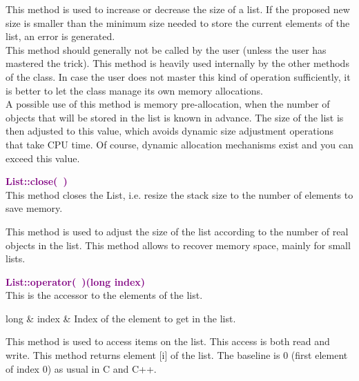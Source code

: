 This method is used to increase or decrease the size of a list.
If the proposed new size is smaller than the minimum size needed to store the current elements of the list, an error is generated.\\
This method should generally not be called by the user (unless the user has mastered the trick).
This method is heavily used internally by the other methods of the class.
In case the user does not master this kind of operation sufficiently, it is better to let the class manage its own memory allocations.\\
A possible use of this method is memory pre-allocation, when the number of objects that will be stored in the list is known in advance.
The size of the list is then adjusted to this value, which avoids dynamic size adjustment operations that take CPU time.
Of course, dynamic allocation mechanisms exist and you can exceed this value.

\textcolor{purple}{\textbf{List::close(~)}}\label{List::close()}\\
This method closes the List, i.e. resize the stack size to the number of elements to save memory.

This method is used to adjust the size of the list according to the number of real objects in the list.
This method allows to recover memory space, mainly for small lists.

\textcolor{purple}{\textbf{List::operator(~)(long index)}}\label{List::operator()(long index)}\\
This is the accessor to the elements of the list.

\begin{tcolorbox}[width=\textwidth,myArgs,tabularx={ll|R}]
long & index & Index of the element to get in the list.
\end{tcolorbox}

This method is used to access items on the list.
This access is both read and write.
This method returns element [i] of the list.
The baseline is 0 (first element of index 0) as usual in C and C++.

